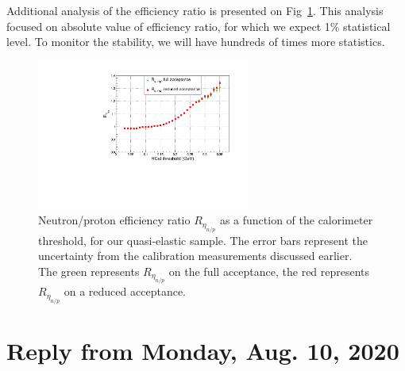 \documentclass[11pt]{article}
\begin{document}
Additional analysis of the efficiency ratio is presented on Fig~\ref{fig:Reta_np}.
This analysis focused on absolute value of efficiency ratio, for which we expect 1\% statistical level.
To monitor the stability, we will have hundreds of times more statistics.
%
\begin{figure}[!h]
  \centering
  \includegraphics[width=7cm]{Reta_np_fthr_errs.pdf}
  \caption{Neutron/proton efficiency ratio $R_{\eta_{n/p}}$ as a function of the calorimeter threshold, for our quasi-elastic sample. The error bars represent the uncertainty from the calibration measurements discussed earlier. The green represents $R_{\eta_{n/p}}$ on the full acceptance, the red represents $R_{\eta_{n/p}}$ on a reduced acceptance. %
            }
  \label{fig:Reta_np}
\end{figure}
%
\newpage

\section*{Reply from Monday, Aug. 10, 2020}
\end{document}
